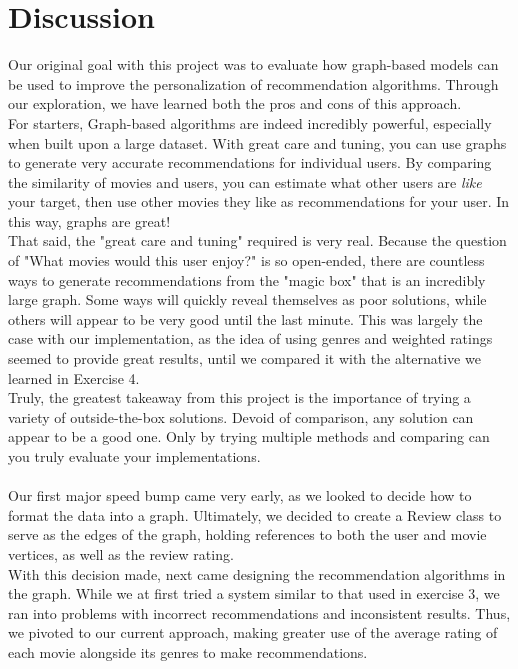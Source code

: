 \documentclass[12pt]{article}
\begin{document}
\section{Discussion}

Our original goal with this project was to evaluate how graph-based models can be used to improve the personalization of recommendation algorithms. Through our exploration, we have learned both the pros and cons of this approach. \\
For starters, Graph-based algorithms are indeed incredibly powerful, especially when built upon a large dataset. With great care and tuning, you can use graphs to generate very accurate recommendations for individual users. By comparing the similarity of movies and users, you can estimate what other users are \textit{like} your target, then use other movies they like as recommendations for your user. In this way, graphs are great! \\
That said, the "great care and tuning" required is very real. Because the question of "What movies would this user enjoy?" is so open-ended, there are countless ways to generate recommendations from the "magic box" that is an incredibly large graph. Some ways will quickly reveal themselves as poor solutions, while others will appear to be very good until the last minute. This was largely the case with our implementation, as the idea of using genres and weighted ratings seemed to provide great results, until we compared it with the alternative we learned in Exercise 4. \\
Truly, the greatest takeaway from this project is the importance of trying a variety of outside-the-box solutions. Devoid of comparison, any solution can appear to be a good one. Only by trying multiple methods and comparing can you truly evaluate your implementations. \\
\\
Our first major speed bump came very early, as we looked to decide how to format the data into a graph. Ultimately, we decided to create a Review class to serve as the edges of the graph, holding references to both the user and movie vertices, as well as the review rating. \\
With this decision made, next came designing the recommendation algorithms in the graph. While we at first tried a system similar to that used in exercise 3, we ran into problems with incorrect recommendations and inconsistent results. Thus, we pivoted to our current approach, making greater use of the average rating of each movie alongside its genres to make recommendations. \\
\end{document}
